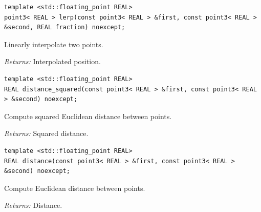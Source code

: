 \par\noindent\begin{minipage}{\linewidth}
\begin{lstlisting}[style=apireference]
template <std::floating_point REAL>
point3< REAL > lerp(const point3< REAL > &first, const point3< REAL > &second, REAL fraction) noexcept;
\end{lstlisting}
{\footnotesize Linearly interpolate two points.\par}
{\footnotesize\textit{Returns:} Interpolated position.\par}
\end{minipage}\par\vspace{1pt}
\par\noindent\begin{minipage}{\linewidth}
\begin{lstlisting}[style=apireference]
template <std::floating_point REAL>
REAL distance_squared(const point3< REAL > &first, const point3< REAL > &second) noexcept;
\end{lstlisting}
{\footnotesize Compute squared Euclidean distance between points.\par}
{\footnotesize\textit{Returns:} Squared distance.\par}
\end{minipage}\par\vspace{1pt}
\par\noindent\begin{minipage}{\linewidth}
\begin{lstlisting}[style=apireference]
template <std::floating_point REAL>
REAL distance(const point3< REAL > &first, const point3< REAL > &second) noexcept;
\end{lstlisting}
{\footnotesize Compute Euclidean distance between points.\par}
{\footnotesize\textit{Returns:} Distance.\par}
\end{minipage}\par\vspace{1pt}
